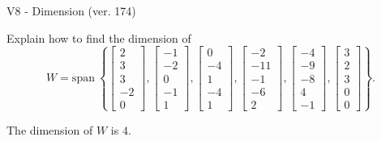 \begin{exercise}
  \begin{exerciseTitle}V8 - Dimension (ver. 174)\end{exerciseTitle}
  \begin{exerciseStatement}
    Explain how to find the dimension of 
\[W=\mathrm{span}\ \left\{\left[\begin{array}{r}
2 \\
3 \\
3 \\
-2 \\
0
\end{array}\right] , \left[\begin{array}{r}
-1 \\
-2 \\
0 \\
-1 \\
1
\end{array}\right] , \left[\begin{array}{r}
0 \\
-4 \\
1 \\
-4 \\
1
\end{array}\right] , \left[\begin{array}{r}
-2 \\
-11 \\
-1 \\
-6 \\
2
\end{array}\right] , \left[\begin{array}{r}
-4 \\
-9 \\
-8 \\
4 \\
-1
\end{array}\right] , \left[\begin{array}{r}
3 \\
2 \\
3 \\
0 \\
0
\end{array}\right]\right\}.\]



  \end{exerciseStatement}
  \begin{exerciseAnswer}
   The dimension of \(W\) is  \(4\).
  


  \end{exerciseAnswer}
\end{exercise}